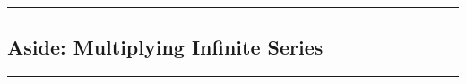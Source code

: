 \documentclass[11pt, a4paper]{article}
\newtheorem*{theorem*}{Theorem}
\theoremstyle{definition}
\newenvironment{aside}[1]{
	\noindent
    \rule{\textwidth}{0.025cm}
    \vspace{-1.75\baselineskip}
    \subsection*{#1}}
{\noindent\rule{\textwidth}{0.025cm}}
\begin{document}
\begin{aside}{Aside: Multiplying Infinite Series}




	
\end{aside}
\end{document}
